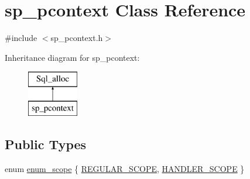 \hypertarget{classsp__pcontext}{}\section{sp\+\_\+pcontext Class Reference}
\label{classsp__pcontext}


{\ttfamily \#include $<$sp\+\_\+pcontext.\+h$>$}

Inheritance diagram for sp\+\_\+pcontext\+:\begin{figure}[H]
\begin{center}
\leavevmode
\includegraphics[height=2.000000cm]{classsp__pcontext}
\end{center}
\end{figure}
\subsection*{Public Types}
\begin{DoxyCompactItemize}
\item 
enum \mbox{\hyperlink{classsp__pcontext_a6252258e34c191cbf1b5e86628cd29c6}{enum\+\_\+scope}} \{ \mbox{\hyperlink{classsp__pcontext_a6252258e34c191cbf1b5e86628cd29c6a7eefe8effea203d6409e38ddb6052d6f}{R\+E\+G\+U\+L\+A\+R\+\_\+\+S\+C\+O\+PE}}, 
\mbox{\hyperlink{classsp__pcontext_a6252258e34c191cbf1b5e86628cd29c6a2db8d8068bbaf5f7f9b60edded7b0bf6}{H\+A\+N\+D\+L\+E\+R\+\_\+\+S\+C\+O\+PE}}
 \}
\end{DoxyCompactItemize}
